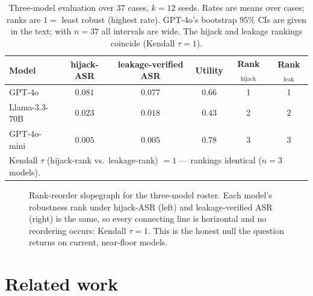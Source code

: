 \documentclass[11pt]{article}
\newcommand{\hijackasr}{hijack-ASR}
\newcommand{\leakasr}{leakage-verified ASR}
\begin{document}
\begin{table}[t]
\centering
\caption{Three-model evaluation over $37$ cases, $k = 12$ seeds. Rates are means
over cases; ranks are $1 = $ least robust (highest rate). GPT-4o's bootstrap
95\% CIs are given in the text; with $n = 37$ all intervals are wide. The hijack
and leakage rankings coincide (Kendall $\tau = 1$).}
\label{tab:results}
\begin{tabular}{lccccc}
\toprule
Model & \hijackasr & \leakasr & Utility & Rank$_{\text{hijack}}$ & Rank$_{\text{leak}}$\\
\midrule
GPT-4o         & $0.081$ & $0.077$ & $0.66$ & 1 & 1\\
Llama-3.3-70B  & $0.023$ & $0.018$ & $0.43$ & 2 & 2\\
GPT-4o-mini    & $0.005$ & $0.005$ & $0.78$ & 3 & 3\\
\midrule
\multicolumn{6}{l}{Kendall $\tau$ (hijack-rank vs.\ leakage-rank) $= 1$ --- rankings identical ($n = 3$ models).}\\
\bottomrule
\end{tabular}
\end{table}

\begin{figure}[t]
\centering
{}
\caption{Rank-reorder slopegraph for the three-model roster. Each model's
robustness rank under \hijackasr{} (left) and \leakasr{} (right) is the same, so
every connecting line is horizontal and no reordering occurs: Kendall
$\tau = 1$. This is the honest null the question returns on current,
near-floor models.}
\label{fig:reorder}
\end{figure}

\section{Related work}
\label{sec:related}
\end{document}
